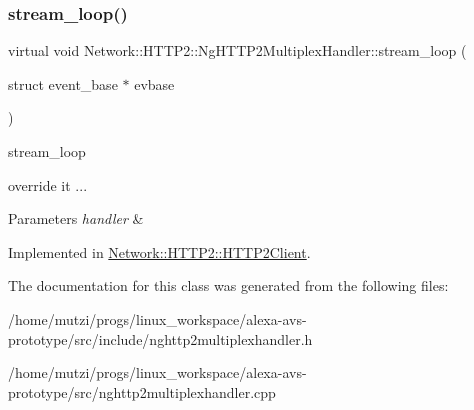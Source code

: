 \subsubsection{\texorpdfstring{stream\+\_\+loop()}{stream\_loop()}}
{\footnotesize\ttfamily virtual void Network\+::\+H\+T\+T\+P2\+::\+Ng\+H\+T\+T\+P2\+Multiplex\+Handler\+::stream\+\_\+loop (\begin{DoxyParamCaption}\item[{struct event\+\_\+base $\ast$}]{evbase }\end{DoxyParamCaption})\hspace{0.3cm}{\ttfamily [pure virtual]}}



stream\+\_\+loop 

override it ... 
\begin{DoxyParams}{Parameters}
{\em handler} & \\
\hline
\end{DoxyParams}


Implemented in \hyperlink{classNetwork_1_1HTTP2_1_1HTTP2Client_a5c5cd10569102998104f2124a3c7a119}{Network\+::\+H\+T\+T\+P2\+::\+H\+T\+T\+P2\+Client}.



The documentation for this class was generated from the following files\+:\begin{DoxyCompactItemize}
\item 
/home/mutzi/progs/linux\+\_\+workspace/alexa-\/avs-\/prototype/src/include/nghttp2multiplexhandler.\+h\item 
/home/mutzi/progs/linux\+\_\+workspace/alexa-\/avs-\/prototype/src/nghttp2multiplexhandler.\+cpp\end{DoxyCompactItemize}
